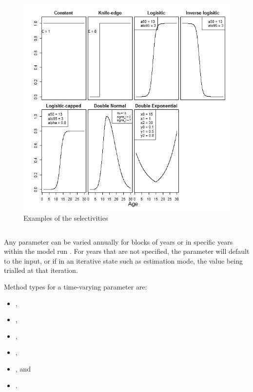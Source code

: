 \begin{figure}[H]
	\includegraphics[scale = 0.7]{Figures/Selectivities.jpeg}
	\caption{Examples of the selectivities}
	\label{fig:select examples}
\end{figure}


\subsection{}\label{sec:TimeVarying} 

Any parameter can be varied annually for blocks of years or in specific years within the model run . For years that are not specified, the parameter will default to the input, or if in an iterative state such as estimation mode, the value being trialled at that iteration.

Method types for a time-varying parameter are:

\begin{itemize}
\item {},
\item {},
\item {},
\item {},
\item {}, and
\item {}.
\end{itemize}

